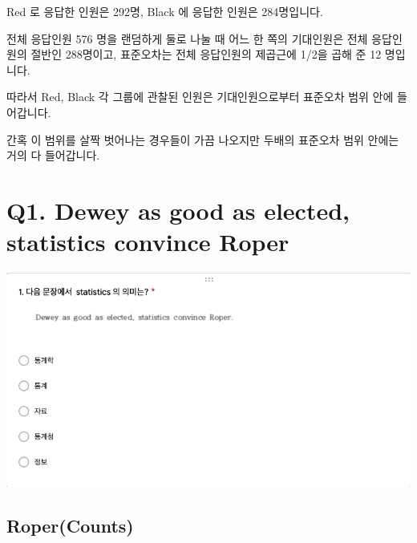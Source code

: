 \documentclass[
]{book}
\begin{document}
Red 로 응답한 인원은 292명, Black 에 응답한 인원은 284명입니다.

전체 응답인원 576 명을 랜덤하게 둘로 나눌 때 어느 한 쪽의 기대인원은 전체 응답인원의 절반인 288명이고, 표준오차는 전체 응답인원의 제곱근에 1/2을 곱해 준 12 명입니다.

따라서 Red, Black 각 그룹에 관찰된 인원은 기대인원으로부터 표준오차 범위 안에 들어갑니다.

간혹 이 범위를 살짝 벗어나는 경우들이 가끔 나오지만 두배의 표준오차 범위 안에는 거의 다 들어갑니다.

\section{Q1. Dewey as good as elected, statistics convince Roper}\label{q1.-dewey-as-good-as-elected-statistics-convince-roper}

\begin{flushleft}\includegraphics[width=1\linewidth]{./pics/Quiz210302_01} \end{flushleft}

\subsection{Roper(Counts)}\label{ropercounts}
\end{document}
